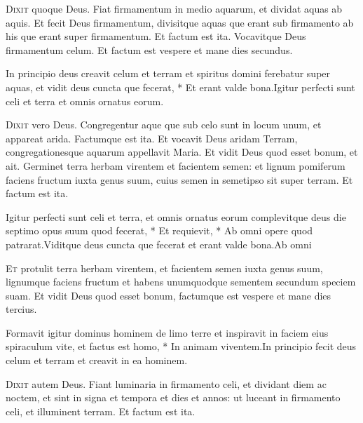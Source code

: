 \begin{multicols*}{2}
\lettrine[lines=2]{\zallmancaps \color{Blue} D}{ixit} quoque Deus. Fiat firmamentum in medio aquarum, et dividat aquas ab aquis. Et fecit Deus firmamentum, divisitque aquas que erant sub firmamento ab his que erant super firmamentum. Et factum est ita. Vocavitque Deus firmamentum celum. Et factum est vespere et mane dies secundus.
\begin{responsory}
{In principio deus creavit celum et terram et spiritus domini ferebatur super aquas, et vidit deus cuncta que fecerat, * Et erant valde bona.}{Igitur perfecti sunt celi et terra et omnis ornatus eorum.}
\end{responsory}
\lettrine[lines=2]{\zallmancaps \color{Red} D}{ixit} vero Deus. Congregentur aque que sub celo sunt in locum unum, et appareat arida. Factumque est ita. Et vocavit Deus aridam Terram, congregationesque aquarum appellavit Maria. Et vidit Deus quod esset bonum, et ait. Germinet terra herbam virentem et facientem semen: et lignum pomiferum faciens fructum iuxta genus suum, cuius semen in semetipso sit super terram. Et factum est ita.
\begin{responsory-final}
{Igitur perfecti sunt celi et terra, et omnis ornatus eorum complevitque deus die septimo opus suum quod fecerat, * Et requievit, * Ab omni opere quod patrarat.}{Viditque deus cuncta que fecerat et erant valde bona.}{Ab omni}
\end{responsory-final}
\lettrine[lines=2]{\zallmancaps \color{Blue} E}{t} protulit terra herbam virentem, et facientem semen iuxta genus suum, lignumque faciens fructum et habens unumquodque sementem secundum speciem suam. Et vidit Deus quod esset bonum, factumque est vespere et mane dies tercius.
\begin{responsory}
{Formavit igitur dominus hominem de limo terre et inspiravit in faciem eius spiraculum vite, et factus est homo, * In animam viventem.}{In principio fecit deus celum et terram et creavit in ea hominem.}
\end{responsory}
\lettrine[lines=2]{\zallmancaps \color{Red} D}{ixit} autem Deus. Fiant luminaria in firmamento celi, et dividant diem ac noctem, et sint in signa et tempora et dies et annos: ut luceant in firmamento celi, et illuminent terram. Et factum est ita.

\end{multicols*}
